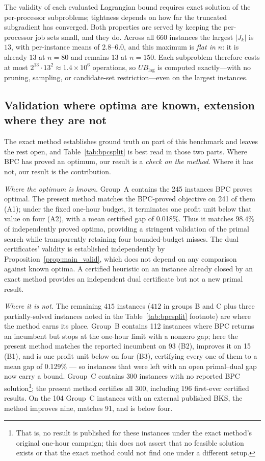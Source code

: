 \documentclass[preprint,12pt]{elsarticle}
\begin{document}
The validity of each evaluated Lagrangian bound requires exact solution of the per-processor subproblems; tightness depends on how far the truncated subgradient has converged. Both properties are served by keeping the per-processor job sets small,
and they do. Across all 660 instances the largest $|J_k|$ is $13$, with
per-instance means of $2.8$--$6.0$, and this maximum is \emph{flat in $n$}: it is
already $13$ at $n=80$ and remains $13$ at $n=150$. Each subproblem therefore
costs at most $2^{13}\cdot 13^2\approx 1.4\times10^{6}$ operations, so
$UB_{\text{lag}}$ is computed exactly---with no pruning, sampling, or
candidate-set restriction---even on the largest instances.

\subsection{Validation where optima are known, extension where they are not}

The exact method establishes ground truth on part of this benchmark and leaves the rest open, and Table~\ref{tab:bpcsplit} is best read in those two parts. Where BPC has proved an optimum, our result is a \emph{check on the method}. Where it has not, our result is the contribution.

\emph{Where the optimum is known.} Group~A contains the 245 instances BPC proves optimal. The present method matches the BPC-proved objective on 241 of them (A1); under the fixed one-hour budget, it terminates one profit unit below that value on four (A2), with a mean certified gap of 0.018\%. Thus it matches $98.4\%$ of independently proved optima, providing a stringent validation of the primal search while transparently retaining four bounded-budget misses. The dual certificates' validity is established independently by Proposition~\ref{prop:main_valid}, which does not depend on any comparison against known optima. A certified heuristic on an instance already closed by an exact method provides an independent dual certificate but not a new primal result.

\emph{Where it is not.} The remaining $415$ instances ($412$ in groups B and C plus three partially-solved instances noted in the Table~\ref{tab:bpcsplit} footnote) are where the method earns its place. Group~B contains 112 instances where BPC returns an incumbent but stops at the one-hour limit with a nonzero gap; here the present method matches the reported incumbent on 93 (B2), improves it on 15 (B1), and is one profit unit below on four (B3), certifying every one of them to a mean gap of 0.129\% --- so instances that were left with an open primal--dual gap now carry a bound. Group~C contains 300 instances with no reported BPC solution\footnote{That is, no result is published for these instances under the exact method's original one-hour campaign; this does not assert that no feasible solution exists or that the exact method could not find one under a different setup.}; the present method certifies all 300, including 196 first-ever certified results. On the 104 Group~C instances with an external published BKS, the method improves nine, matches 91, and is below four.
\end{document}
